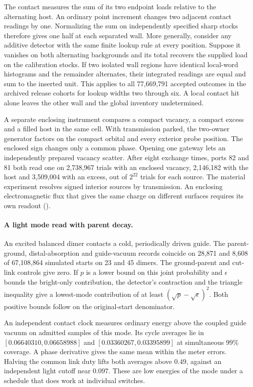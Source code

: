 The contact measures the sum of its two endpoint loads relative to the
alternating host. An ordinary point increment changes two adjacent
contact readings by one. Normalizing the sum on independently specified
sharp stocks therefore gives one half at each separated wall.
More generally, consider any additive detector with the same finite
lookup rule at every position. Suppose it vanishes on both alternating
backgrounds and its total recovers the supplied load on the calibration
stocks. If two isolated wall regions have identical local-word
histograms and the remainder alternates, their integrated readings
are equal and sum to the inserted unit. This applies to all 77,669,791
accepted outcomes in the archived release cohorts for lookup widths
two through six. A local contact hit alone leaves the other wall and
the global inventory undetermined.

A separate enclosing instrument compares a compact vacancy, a compact
excess and a filled host in the same cell. With transmission parked,
the two-owner generator factors on the compact orbital and every
exterior probe position. The enclosed sign changes only a common phase.
Opening one gateway lets an independently prepared vacancy scatter.
After eight exchange times, ports 82 and 81 both read one on
2,738,967 trials with an enclosed vacancy, 2,146,182 with the host
and 3,509,004 with an excess, out of $2^{22}$ trials for each source.
The material experiment resolves signed interior sources by transmission.
An enclosing electromagnetic flux that gives the same charge on
different surfaces requires its own readout
().

\paragraph{A light mode read with parent decay.}
An excited balanced dimer contacts a cold, periodically driven
guide. The parent-ground, distal-absorption and guide-vacuum
records coincide on 28,871 and 8,608 of 67,108,864 simulated
starts on 23 and 45 dimers. The ground-parent and cut-link
controls give zero. If \(p\) is a lower bound on this joint
probability and \(\epsilon\) bounds the bright-only contribution,
the detector's contraction and the triangle inequality give a
lowest-mode contribution of at least
\((\sqrt p-\sqrt\epsilon)^2\). Both positive bounds follow on
the original-start denominator.

An independent contact clock measures ordinary energy above the
coupled guide vacuum on admitted samples of this mode. Its cycle
averages lie in \([0.06640310,0.06658988]\) and
\([0.03360267,0.03395899]\) at simultaneous \(99\%\) coverage. A phase
derivative gives the same mean within the meter errors. Halving
the common link duty lifts both averages above \(0.49\), against
an independent light cutoff near \(0.097\). These are low energies
of the mode under a schedule that does work at individual switches.

